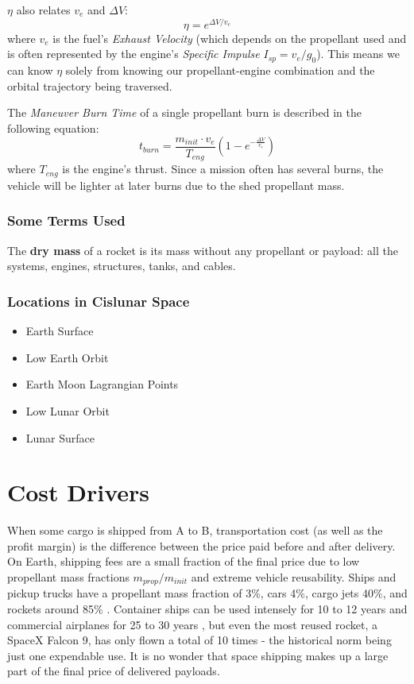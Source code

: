 \documentclass{article}
\begin{document}
$\eta$ also relates $v_e$ and $\Delta V$:
\begin{equation}
\eta = e^{\Delta V / v_e}
\end{equation}
where $v_e$ is the fuel's \textit{Exhaust Velocity} (which depends on the propellant used and is often represented by the engine's \textit{Specific Impulse} $I_{sp} = v_e / g_0$). This means we can know $\eta$ solely from knowing our propellant-engine combination and the orbital trajectory being traversed.

The \textit{Maneuver Burn Time} of a single propellant burn is described in the following equation:
\begin{equation}
t_{burn}=\frac{m_{init} \cdot v_e}{T_{eng}}\left(1-e^{-\frac{\Delta V}{v_e}}\right)
\end{equation}
where $T_{eng}$ is the engine's thrust. Since a mission often has several burns, the vehicle will be lighter at later burns due to the shed propellant mass.

\subsubsection{Some Terms Used}
The \textbf{dry mass} of a rocket is its mass without any propellant or payload: all the systems, engines, structures, tanks, and cables.

\subsubsection{Locations in Cislunar Space}
\begin{itemize}
    \item Earth Surface
    \item Low Earth Orbit
    \item Earth Moon Lagrangian Points
    \item Low Lunar Orbit
    \item Lunar Surface
\end{itemize}

\section{Cost Drivers}
When some cargo is shipped from A to B, transportation cost (as well as the profit margin) is the difference between the price paid before and after delivery. On Earth, shipping fees are a small fraction of the final price due to low propellant mass fractions $m_{prop}/m_{init}$ and extreme vehicle reusability. Ships and pickup trucks have a propellant mass fraction of 3\%, cars 4\%, cargo jets 40\%, and rockets around 85\% \cite{NASA}. Container ships can be used intensely for 10 to 12 years \cite{Containercorp} and commercial airplanes for 25 to 30 years \cite{Quora}, but even the most reused rocket, a SpaceX Falcon 9, has only flown a total of 10 times \cite{EclipseAviation} - the historical norm being just one expendable use. It is no wonder that space shipping makes up a large part of the final price of delivered payloads.
\end{document}
